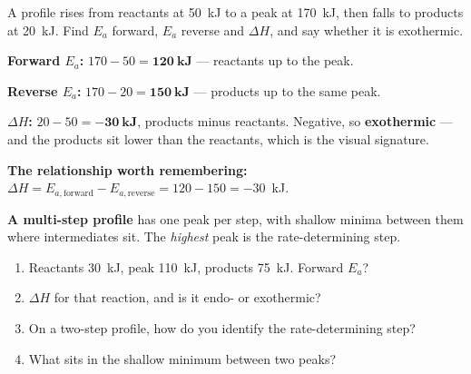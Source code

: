 \documentclass{apchem-worksheet}
\begin{document}
\begin{workedexample}
A profile rises from reactants at \SI{50}{\kilo\joule} to a peak at
\SI{170}{\kilo\joule}, then falls to products at \SI{20}{\kilo\joule}.
Find $E_a$ forward, $E_a$ reverse and $\Delta H$, and say whether it is
exothermic.

\textbf{Forward $E_a$:} $170 - 50 = \mathbf{120~kJ}$ --- reactants up to
the peak.

\textbf{Reverse $E_a$:} $170 - 20 = \mathbf{150~kJ}$ --- products up to
the same peak.

\textbf{$\Delta H$:} $20 - 50 = \mathbf{-30~kJ}$, products minus
reactants. Negative, so \textbf{exothermic} --- and the products sit lower
than the reactants, which is the visual signature.

\textbf{The relationship worth remembering:}
$\Delta H = E_{a,\text{forward}} - E_{a,\text{reverse}} = 120 - 150 =
-30$~kJ. \checkmark

\textbf{A multi-step profile} has one peak per step, with shallow minima
between them where intermediates sit. The \emph{highest} peak is the
rate-determining step.
\end{workedexample}

\begin{yourturn}
\begin{enumerate}[leftmargin=*,itemsep=0.5em]
  \item Reactants \SI{30}{\kilo\joule}, peak \SI{110}{\kilo\joule},
        products \SI{75}{\kilo\joule}. Forward $E_a$?
        \workspace[1.4cm]
  \item $\Delta H$ for that reaction, and is it endo- or exothermic?
        \workspace[1.6cm]
  \item On a two-step profile, how do you identify the rate-determining
        step? \workspace[1.6cm]
  \item What sits in the shallow minimum between two peaks?
        \workspace[1.4cm]
\end{enumerate}
\end{yourturn}
\end{document}
